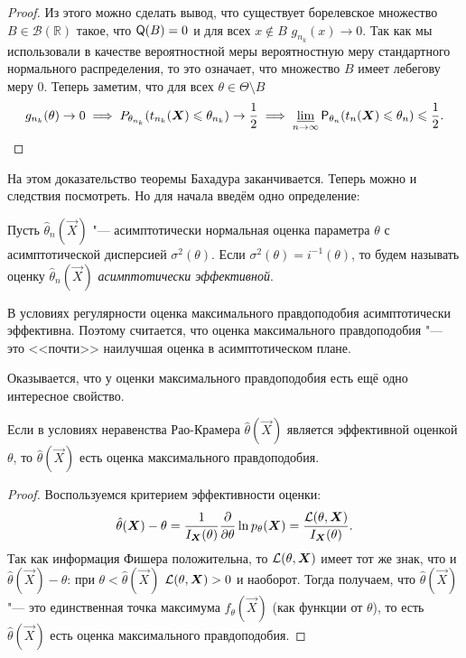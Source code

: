 \begin{proof}
    Из этого можно сделать вывод, что существует борелевское множество $B \in \mathcal{B}(\mathbb{R})$ такое, что $\QQ(B) = 0$ и для всех $x \not\in B$ $g_{n_{k}}(x) \to 0$. Так как мы использовали в качестве вероятностной меры вероятностную меру стандартного нормального распределения, то это означает, что множество $B$ имеет лебегову меру 0. Теперь заметим, что для всех $\theta \in \Theta \setminus B$
    \[
        g_{n_{k}}(\theta) \to 0 \implies P_{\theta_{n_{k}}}(t_{n_{k}}(\vec{X}) \leq \theta_{n_{k}}) \to \frac{1}{2} \implies \varliminf_{n \to \infty} \Pr_{\theta_{n}}(t_{n}(\vec{X}) \leq \theta_{n}) \leq \frac{1}{2}. \qedhere
    \]
\end{proof}

На этом доказательство теоремы Бахадура заканчивается. Теперь можно и следствия посмотреть. Но для начала введём одно определение:
\begin{definition}
    Пусть $\hat{\theta}_{n}(\vec{X})$ "--- асимптотически нормальная оценка параметра $\theta$ с асимптотической дисперсией $\sigma^{2}(\theta)$. Если $\sigma^{2}(\theta) = i^{-1}(\theta)$, то будем называть оценку $\hat{\theta}_{n}(\vec{X})$ \emph{асимптотически эффективной}.
\end{definition}
\begin{consequence}
    В условиях регулярности оценка максимального правдоподобия асимптотически эффективна. Поэтому считается, что оценка максимального правдоподобия "--- это <<почти>> наилучшая оценка в асимптотическом плане.
\end{consequence}

Оказывается, что у оценки максимального правдоподобия есть ещё одно интересное свойство.
\begin{theorem}
    Если в условиях неравенства Рао-Крамера $\hat{\theta}(\vec{X})$ является эффективной оценкой $\theta$, то $\hat{\theta}(\vec{X})$ есть оценка максимального правдоподобия.
\end{theorem}
\begin{proof}
    Воспользуемся критерием эффективности оценки:
    \[
        \hat{\theta}(\vec{X}) - \theta = \frac{1}{I_{\vec{X}}(\theta)}\pdv{\theta}\ln p_{\theta}(\vec{X}) = \frac{\Ell(\theta, \vec{X})}{I_{\vec{X}}(\theta)}.
    \]
    Так как информация Фишера положительна, то $\Ell(\theta, \vec{X})$ имеет тот же знак, что и $\hat{\theta}(\vec{X}) - \theta$: при $\theta < \hat{\theta}(\vec{X})$ $\Ell(\theta, \vec{X}) > 0$ и наоборот. Тогда получаем, что $\hat{\theta}(\vec{X})$ "--- это единственная точка максимума $f_{\theta}(\vec{X})$ (как функции от $\theta$), то есть $\hat{\theta}(\vec{X})$ есть оценка максимального правдоподобия.
\end{proof}

